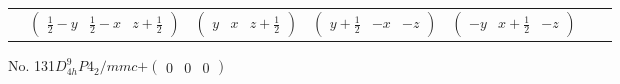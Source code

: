 \documentclass[fleqn,9pt,landscape]{jsarticle}
\begin{document}
\begin{center}
\begin{longtable}{ccccccc}
& $ \begin{pmatrix} \frac{1}{2} - y & \frac{1}{2} - x & z + \frac{1}{2} \end{pmatrix} $ & $ \begin{pmatrix} y & x & z + \frac{1}{2} \end{pmatrix} $ & $ \begin{pmatrix} y + \frac{1}{2} & - x & - z \end{pmatrix} $ & $ \begin{pmatrix} - y & x + \frac{1}{2} & - z \end{pmatrix} $ & $  $ & $  $ \\
\end{longtable}
\end{center}
\newpage
No. 131\quad$D_{4h}^{9}$\quad$P4_2/mmc$\quad[ tetragonal ]\quad$+\begin{pmatrix} 0 & 0 & 0 \end{pmatrix}$
\end{document}
